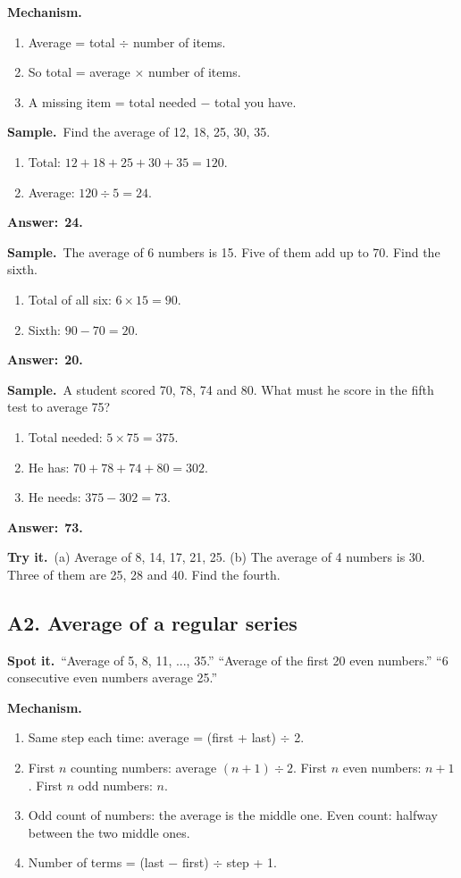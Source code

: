 \documentclass[11pt,a4paper]{article}
\let\oldsubsection\subsection
\renewcommand{\subsection}{\needspace{9\baselineskip}\oldsubsection}
\newcommand{\spot}{\textbf{\color{ember}Spot it.}\ }
\newcommand{\mech}{\textbf{\color{ember}Mechanism.}\ }
\newif\ifkeepsamp
\newcommand{\ans}[1]{\par\nopagebreak\noindent\textbf{\color{ember}Answer:}\ \textbf{#1}\par}
\newcommand{\samp}{\ifkeepsamp\needspace{4\baselineskip}\fi\textbf{\color{ember}Sample.}\ }
\newcommand{\tryit}[1]{\textbf{\color{ember}Try it.}\ #1}
\begin{document}
\mech
\begin{enumerate}
\item Average = total $\div$ number of items.
\item So total = average $\times$ number of items.
\item A missing item = total needed $-$ total you have.
\end{enumerate}

\samp Find the average of 12, 18, 25, 30, 35.
\begin{enumerate}
\item Total: $12 + 18 + 25 + 30 + 35 = 120$.
\item Average: $120 \div 5 = 24$.
\end{enumerate}
\ans{24.}

\samp The average of 6 numbers is 15. Five of them add up to 70. Find the sixth.
\begin{enumerate}
\item Total of all six: $6 \times 15 = 90$.
\item Sixth: $90 - 70 = 20$.
\end{enumerate}
\ans{20.}

\samp A student scored 70, 78, 74 and 80. What must he score in the fifth test to average 75?
\begin{enumerate}
\item Total needed: $5 \times 75 = 375$.
\item He has: $70 + 78 + 74 + 80 = 302$.
\item He needs: $375 - 302 = 73$.
\end{enumerate}
\ans{73.}

\tryit (a) Average of 8, 14, 17, 21, 25. (b) The average of 4 numbers is 30. Three of them are 25, 28 and 40. Find the fourth.

\subsection{A2. Average of a regular series}
\spot ``Average of 5, 8, 11, ..., 35.'' ``Average of the first 20 even numbers.'' ``6 consecutive even numbers average 25.''

\mech
\begin{enumerate}
\item Same step each time: average = (first + last) $\div$ 2.
\item First $n$ counting numbers: average $(n + 1) \div 2$. First $n$ even numbers: $n + 1$. First $n$ odd numbers: $n$.
\item Odd count of numbers: the average is the middle one. Even count: halfway between the two middle ones.
\item Number of terms = (last $-$ first) $\div$ step + 1.
\end{enumerate}
\end{document}
